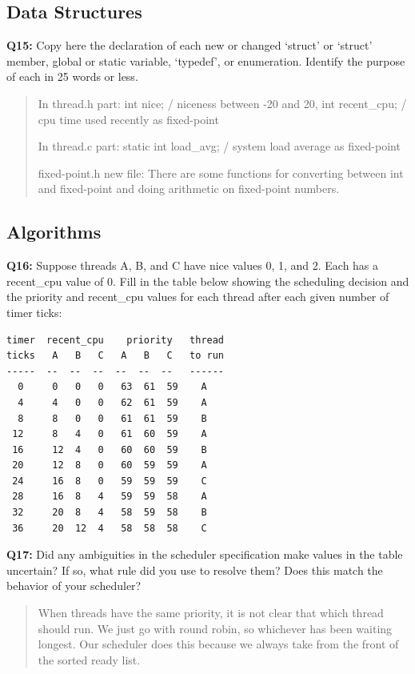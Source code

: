 \documentclass[a4paper,11pt]{paper}
\begin{document}
\subsection{Data Structures}

\textbf{Q15:} Copy here the declaration of each new or changed `struct' or
`struct' member, global or static variable, `typedef', or enumeration.  Identify
the purpose of each in 25 words or less.

\begin{quote}
In thread.h part:
  int nice; / niceness between -20 and 20,                                
  int recent\_cpu; / cpu time used recently as fixed-point

In thread.c part:
  static int load\_avg; / system load average as fixed-point

fixed-point.h new file: There are some functions for converting between int and fixed-point and doing arithmetic on fixed-point numbers.
\end{quote}

\subsection{Algorithms}

\textbf{Q16:} Suppose threads A, B, and C have nice values 0, 1, and 2.  Each
has a recent\_cpu value of 0.  Fill in the table below showing the scheduling
decision and the priority and recent\_cpu values for each thread after each
given number of timer ticks:

\small
\begin{Verbatim}[frame=single]
timer  recent_cpu    priority   thread
ticks   A   B   C   A   B   C   to run
-----  --  --  --  --  --  --   ------
  0     0   0   0   63  61  59    A
  4     4   0   0   62  61  59    A
  8     8   0   0   61  61  59    B
 12     8   4   0   61  60  59    A
 16     12  4   0   60  60  59    B
 20     12  8   0   60  59  59    A
 24     16  8   0   59  59  59    C
 28     16  8   4   59  59  58    A
 32     20  8   4   58  59  58    B
 36     20  12  4   58  58  58    C
\end{Verbatim}


\textbf{Q17:} Did any ambiguities in the scheduler specification make values in
the table uncertain?  If so, what rule did you use to resolve them?  Does this
match the behavior of your scheduler?

\begin{quote}
When threads have the same priority, it is not clear that which thread should run. 
We just go with round robin, so whichever has been waiting longest. 
Our scheduler does this because we always take from the front of the sorted ready list.
\end{quote}
\end{document}
